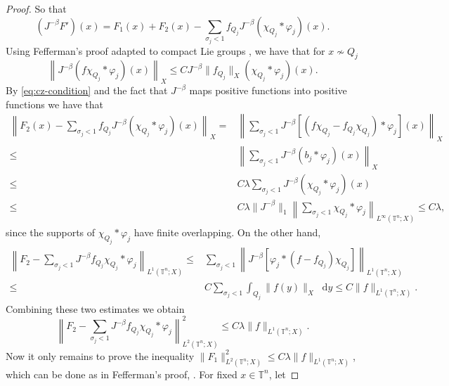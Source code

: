 \documentclass[12pt, reqno]{amsart}
\theoremstyle{definition}
\theoremstyle{remark}
\numberwithin{equation}{section}
\newcommand*\diff{\mathop{}\!\mathrm{d}}
\begin{document}
\begin{proof}
    So that 
    \begin{equation*}
        (J^{-\beta} F')(x) = F_1(x) + F_2(x) - \sum_{\sigma_j < 1}f_{Q_j}J^{-\beta} (\chi_{Q_j}*\varphi_j)(x).
    \end{equation*}
    Using Fefferman's proof adapted to compact Lie groups \cite{cardona-ruzhansky}, we have that for $x \nsim Q_j$ 
    \begin{equation*}
        \left\|J^{-\beta} (f\chi_{Q_j} *\varphi_j)(x)\right\|_X \leq CJ^{-\beta} \|f_{Q_j}\|_X (\chi_{Q_j}*\varphi_j)(x).
    \end{equation*}
    By \cref{eq:cz-condition} and the fact that $J^{-\beta}$ maps positive functions into positive functions we have that
    \begin{align*}
        \left\| F_2(x) - \sum_{\sigma_j<1} f_{Q_j}J^{-\beta}(\chi_{Q_j} * \varphi_j)(x) \right\|_X = & \left\| \sum_{\sigma_j<1} J^{-\beta}[(f\chi_{Q_j} - f_{Q_j}\chi_{Q_j}) * \varphi_j](x) \right\|_X \\
        \leq & \left\| \sum_{\sigma_j<1} J^{-\beta}(b_j * \varphi_j)(x) \right\|_X \\ 
        \leq & C\lambda \sum_{\sigma_j<1} J^{-\beta} (\chi_{Q_j}*\varphi_j)(x)\\
        \leq & C\lambda \|J^{-\beta}\|_1\left\| \sum_{\sigma_j <1}\chi_{Q_j} *\varphi_j \right\|_{L^\infty(\mathbb{T}^n; X)} \leq C\lambda ,
    \end{align*}
    since the supports of $ \chi_{Q_j} * \varphi_j $ have finite overlapping. On the other hand,
    \begin{align*}
        \left\| F_2 - \sum_{\sigma_j < 1} J^{-\beta} f_{Q_j}\chi_{Q_j} * \varphi_j \right\|_{L^1(\mathbb{T}^n; X)} \leq & \sum_{\sigma_j<1} \left\|J^{-\beta}[\varphi_j * (f - f_{Q_j})\chi_{Q_j}]\right\|_{L^1(\mathbb{T}^n; X)} \\
        \leq & C\sum_{\sigma_j < 1}\int_{Q_j}\|f(y)\|_X \diff y \leq C\|f\|_{L^1(\mathbb{T}^n; X)}.
    \end{align*}
    Combining these two estimates we obtain 
    \begin{equation*}
        \left\| F_2 - \sum_{\sigma_j < 1} J^{-\beta} f_{Q_j}\chi_{Q_j} * \varphi_j \right\|_{L^2(\mathbb{T}^n; X)}^2 \leq C\lambda\|f\|_{L^1(\mathbb{T}^n; X)} .
    \end{equation*}
    Now it only remains to prove the inequality $\|F_1\|_{L^2(\mathbb{T}^n; X)}^2 \leq C\lambda \|f\|_{L^1(\mathbb{T}^n; X)}$, which can be done as in Fefferman's proof, \cite{cardona-ruzhansky}. For fixed $x \in \mathbb{T}^n$, let 

\end{proof}
\end{document}

